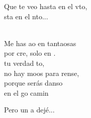 \begin{cancion}
\begin{chorus}
		Que te veo hasta en el vto, \\
		sta en el nto...\jump\\
	\end{chorus}%
	   \\
	Me has ao en tantaosas \\
	por cre, solo en . \\
	 tu verdad to, \\
	no hay moos para rense,\\
	porque  serás danso \\
	en el go camin\jump\\
	\begin{chorus}%
		Pero un a dejé... \jump\\
	\end{chorus}%
\end{cancion}%

